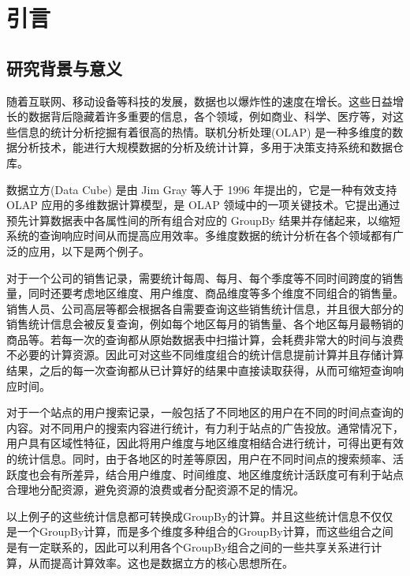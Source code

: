\chapter{引言}

\section{研究背景与意义}
随着互联网、移动设备等科技的发展，数据也以爆炸性的速度在增长。这些日益增长的数据背后隐藏着许多重要的信息，各个领域，例如商业、科学、医疗等，对这些信息的统计分析挖掘有着很高的热情。联机分析处理(OLAP) \cite{chaudhuri1997overview} 是一种多维度的数据分析技术，能进行大规模数据的分析及统计计算，多用于决策支持系统和数据仓库。


数据立方(Data Cube) \cite{gray1997data}是由 Jim Gray 等人于 1996 年提出的，它是一种有效支持 OLAP 应用的多维数据计算模型，是 OLAP 领域中的一项关键技术。它提出通过预先计算数据表中各属性间的所有组合对应的 GroupBy 结果并存储起来，以缩短系统的查询响应时间从而提高应用效率。多维度数据的统计分析在各个领域都有广泛的应用，以下是两个例子。

对于一个公司的销售记录，需要统计每周、每月、每个季度等不同时间跨度的销售量，同时还要考虑地区维度、用户维度、商品维度等多个维度不同组合的销售量。销售人员、公司高层等都会根据各自需要查询这些销售统计信息，并且很大部分的销售统计信息会被反复查询，例如每个地区每月的销售量、各个地区每月最畅销的商品等。若每一次的查询都从原始数据表中扫描计算，会耗费非常大的时间与浪费不必要的计算资源。因此可对这些不同维度组合的统计信息提前计算并且存储计算结果，之后的每一次查询都从已计算好的结果中直接读取获得，从而可缩短查询响应时间。

对于一个站点的用户搜索记录，一般包括了不同地区的用户在不同的时间点查询的内容。对不同用户的搜索内容进行统计，有力利于站点的广告投放。通常情况下，用户具有区域性特征，因此将用户维度与地区维度相结合进行统计，可得出更有效的统计信息。同时，由于各地区的时差等原因，用户在不同时间点的搜索频率、活跃度也会有所差异，结合用户维度、时间维度、地区维度统计活跃度可有利于站点合理地分配资源，避免资源的浪费或者分配资源不足的情况。

以上例子的这些统计信息都可转换成GroupBy的计算。并且这些统计信息不仅仅是一个GroupBy计算，而是多个维度多种组合的GroupBy计算，而这些组合之间是有一定联系的，因此可以利用各个GroupBy组合之间的一些共享关系进行计算，从而提高计算效率。这也是数据立方的核心思想所在。

